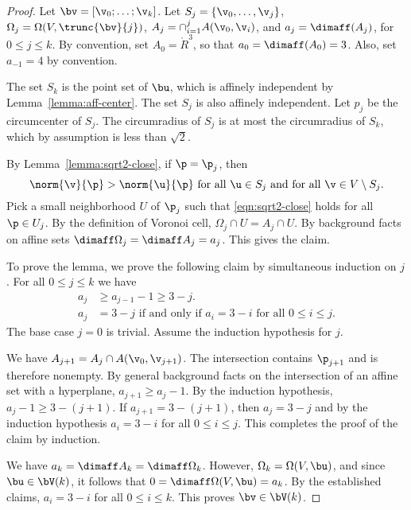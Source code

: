 \begin{proof} 
Let $\bv = [\v_0;\ldots;\v_k]$.  
Let $S_j = \{\v_0,\ldots,\v_j\}$,  
$\Omega_j = \Omega(V,\trunc{\bv}{j})$, 
$A_j=\cap_{i=1}^j A(\v_0,\v_i)$, and $a_j = \dimaff(A_j)$, for $0\le j\le k$.
By convention, set $A_0 = \ring{R}^3$, so that $a_0=\dimaff(A_0) = 3$.
Also, set $a_{-1} = 4$ by convention.

The set $S_k$ is the point set of $\bu$, which is affinely independent
by Lemma~\ref{lemma:aff-center}.  The set $S_j$ is also affinely
independent.  Let $p_j$ be the circumcenter of $S_j$.  The
circumradius of $S_j$ is at most the circumradius of $S_k$, which by
assumption is less than $\sqrt2$.

By Lemma~\ref{lemma:sqrt2-close}, if $\p=\p_j$, then
\begin{equation}\label{eqn:sqrt2-close} 
\norm{\v}{\p} > \norm{\u}{\p}\text{ for all }\u\in S_j
\text{ and for all }\v\in V\setminus S_j.
\end{equation}   
Pick a small neighborhood $U$ of $\p_j$ such that \eqref{eqn:sqrt2-close} holds
for all $\p\in U_j$.  By the definition of Voronoi cell, $\Omega_j \cap U=A_j\cap U$.
By background facts on affine sets $\dimaff\Omega_j = \dimaff A_j=a_j$.  This gives
the claim.

To prove the lemma, we prove the following claim by simultaneous
induction on $j$.  For all $0\le j\le k$ we have
\begin{align*}
a_j &\ge a_{j-1} - 1\ge 3-j.\\
a_j &= 3-j \text{ if and only if } a_i=3-i \text{ for all } 0\le i\le j.
\end{align*}
The base case $j=0$ is trivial.  Assume the induction hypothesis for $j$.

We have $A_{j+1} = A_{j}\cap A(\v_0,\v_{j+1})$.  The intersection
contains $\p_{j+1}$ and is therefore nonempty.  By general background
facts on the intersection of an affine set with a hyperplane, $a_{j+1}
\ge a_{j}-1$.  By the induction hypothesis, $a_{j}-1\ge 3-(j+1)$.  If
$a_{j+1}=3-(j+1)$, then $a_{j}=3-j$ and by the induction hypothesis
$a_{i}=3-i$ for all $0\le i\le j$. This completes the proof of the
claim by induction.

We have $a_k = \dimaff A_k=\dimaff \Omega_k$.  However, $\Omega_k=
\Omega(V,\bu)$, and since $\bu\in \bV(k)$, it follows that
$0=\dimaff\Omega(V,\bu)=a_k$.  By the established claims, $a_i = 3-i$
for all $0\le i\le k$.  This proves $\bv\in\bV(k)$.


\end{proof}
